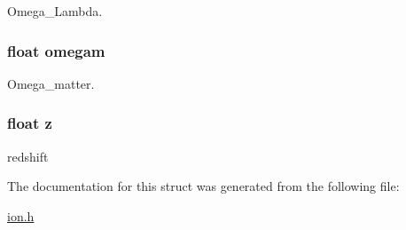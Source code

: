 Omega\+\_\+\+Lambda. 

\hypertarget{structparams_a1143ccc333b13b81d68f112fc1122acd}{
\subsubsection[{omegam}]{\setlength{\rightskip}{0pt plus 5cm}float omegam}}\label{structparams_a1143ccc333b13b81d68f112fc1122acd}


Omega\+\_\+matter. 

\hypertarget{structparams_af73583b1e980b0aa03f9884812e9fd4d}{
\subsubsection[{z}]{\setlength{\rightskip}{0pt plus 5cm}float z}}\label{structparams_af73583b1e980b0aa03f9884812e9fd4d}


redshift 



The documentation for this struct was generated from the following file\+:\begin{DoxyCompactItemize}
\item 
\hyperlink{ion_8h}{ion.\+h}\end{DoxyCompactItemize}

